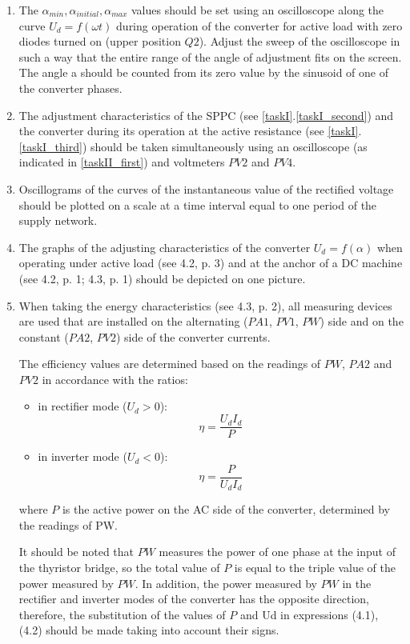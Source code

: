 \documentclass[a4paper,14pt]{article}
\begin{document}
\begin{enumerate}
	\item\label{taskII_first} The $\alpha_{min}, \alpha_{initial}, \alpha_{max}$ values should be set using an oscilloscope 
along the curve $U_d = f(\omega t)$ during operation of the converter for active load 
		with zero diodes turned on (upper position $Q2$).
Adjust the sweep of the oscilloscope in such a way that the entire range of the angle of adjustment fits on the screen.
The angle a should be counted from its zero value by the sinusoid of one of the converter phases.

\item The adjustment characteristics of the SPPC (see \ref{taskI}.\ref{taskI_second}) and the converter 
	during its operation at the active resistance (see \ref{taskI}.\ref{taskI_third}) 
		should be taken simultaneously using an oscilloscope (as indicated in \ref{taskII_first}) 
	and voltmeters $PV2$ and $PV4$.

\item Oscillograms of the curves of the instantaneous value of the rectified voltage should be plotted on a scale at a time interval equal to one period of the supply network.

\item The graphs of the adjusting characteristics of the converter $U_d = f (\alpha)$ when operating 
under active load (see 4.2, p. 3) and at the anchor of a DC machine (see 4.2, p. 1; 4.3, p. 1) 
		should be depicted on one picture.

\item When taking the energy characteristics (see 4.3, p. 2), 
all measuring devices are used that are installed on the alternating ($PA1$, $PV1$, $PW$) 
		side and on the constant ($PA2$, $PV2$) side of the converter currents.

The efficiency values are determined based on the readings of $PW$, $PA2$ and $PV2$ in accordance with the ratios:

\begin{itemize}
	\item in rectifier mode ($U_d> 0$):
$$
		\eta = \frac{U_dI_d}{P}
$$
	\item in inverter mode ($U_d <0$):
$$
		\eta = \frac{P}{U_dI_d}
$$

\end{itemize}
where $P$ is the active power on the AC side of the converter, determined by the readings of PW.

It should be noted that $PW$ measures the power of one phase at the input of the thyristor bridge, 
so the total value of $P$ is equal to the triple value of the power measured by $PW$.
In addition, the power measured by $PW$ in the rectifier and inverter modes of the converter 
has the opposite direction, therefore, the substitution of the values of $P$ and Ud in expressions (4.1), (4.2) 
	should be made taking into account their signs.


\end{enumerate}
\end{document}
